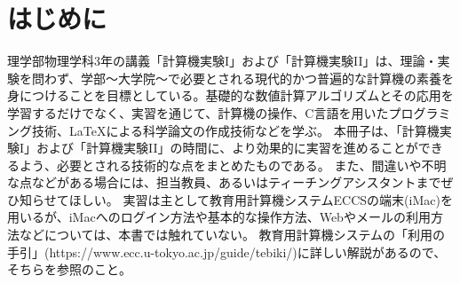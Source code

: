 \section*{はじめに}

\noindent
理学部物理学科3年の講義「計算機実験I」および「計算機実験II」は、理論・実験を問わず、学部〜大学院〜で必要とされる現代的かつ普遍的な計算機の素養を身につけることを目標としている。基礎的な数値計算アルゴリズムとその応用を学習するだけでなく、実習を通じて、計算機の操作、C言語を用いたプログラミング技術、\LaTeX による科学論文の作成技術などを学ぶ。
本冊子は、「計算機実験I」および「計算機実験II」の時間に、より効果的に実習を進めることができるよう、必要とされる技術的な点をまとめたものである。
また、間違いや不明な点などがある場合には、担当教員、あるいはティーチングアシスタントまでぜひ知らせてほしい。
実習は主として教育用計算機システムECCSの端末(iMac)を用いるが、iMacへのログイン方法や基本的な操作方法、Webやメールの利用方法などについては、本書では触れていない。
教育用計算機システムの「利用の手引」(https://www.ecc.u-tokyo.ac.jp/guide/tebiki/)に詳しい解説があるので、そちらを参照のこと。
